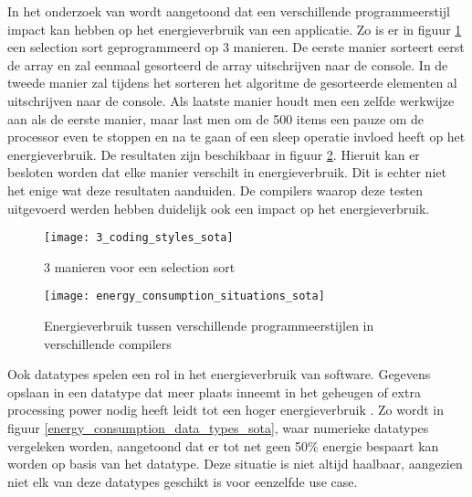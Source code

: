 In het onderzoek van \textcite{Hassan2017} wordt aangetoond dat een verschillende programmeerstijl impact kan hebben op het energieverbruik van een applicatie. Zo is er in figuur \ref{3_coding_styles_sota} een selection sort geprogrammeerd op 3 manieren. De eerste manier sorteert eerst de array en zal eenmaal gesorteerd de array uitschrijven naar de console. In de tweede manier zal tijdens het sorteren het algoritme de gesorteerde elementen al uitschrijven naar de console. Als laatste manier houdt men een zelfde werkwijze aan als de eerste manier, maar last men om de 500 items een pauze om de processor even te stoppen en na te gaan of een sleep operatie invloed heeft op het energieverbruik. De resultaten zijn beschikbaar in figuur \ref{energy_consumption_situations_sota}. Hieruit kan er besloten worden dat elke manier verschilt in energieverbruik. Dit is echter niet het enige wat deze resultaten aanduiden. De compilers waarop deze testen uitgevoerd werden hebben duidelijk ook een impact op het energieverbruik.\\

\bigskip

\begin{figure}[H]
    \texttt{[image: 3\_coding\_styles\_sota]}
    \centering
    \caption{3 manieren voor een selection sort \autocite{Hassan2017}}
    \label{3_coding_styles_sota}
\end{figure}

\begin{figure}[H]
    \texttt{[image: energy\_consumption\_situations\_sota]}
    \centering
    \caption[Energieverbruik tussen programmeerstijlen]{Energieverbruik tussen verschillende programmeerstijlen in verschillende compilers \autocite{Hassan2017}}
    \label{energy_consumption_situations_sota}
\end{figure}



Ook datatypes spelen een rol in het energieverbruik van software. Gegevens opslaan in een datatype dat meer plaats inneemt in het geheugen of extra processing power nodig heeft leidt tot een hoger energieverbruik \autocite{Dutta2023}. Zo wordt in figuur \ref{energy_consumption_data_types_sota}, waar numerieke datatypes vergeleken worden, aangetoond dat er tot net geen 50\% energie bespaart kan worden op basis van het datatype. Deze situatie is niet altijd haalbaar, aangezien niet elk van deze datatypes geschikt is voor eenzelfde use case. 

\bigskip

